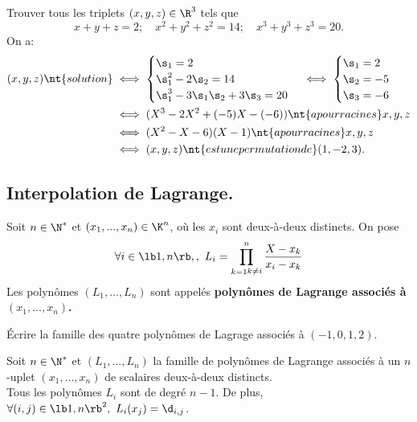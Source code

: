 \documentclass[11pt]{article}
\begin{document}
\begin{ex}{}{}
    Trouver tous les triplets $(x,y,z)\in\R^3$ tels que
    \begin{equation*}
        x+y+z=2; \quad x^2+y^2+z^2=14; \quad x^3+y^3+z^3=20.
    \end{equation*}
    \tcblower
    On a:
    \begin{align*}
        (x,y,z) \nt{ solution} &\iff \begin{cases}
            \s_1 = 2\\ \s_1^2-2\s_2 = 14\\ \s_1^3-3\s_1\s_2+3\s_3=20
        \end{cases} \iff \begin{cases}
            \s_1 = 2\\\s_2=-5\\\s_3=-6
        \end{cases}\\
        &\iff (X^3-2X^2+(-5)X-(-6)) \nt{ a pour racines } x,y,z\\
        &\iff (X^2-X-6)(X-1) \nt{ a pour racines } x,y,z\\
        &\iff (x,y,z) \nt{ est une permutation de } (1,-2,3).
    \end{align*}
\end{ex}

\subsection{Interpolation de Lagrange.}

\begin{defi}{}{}
    Soit $n\in\N^*$ et $(x_1,...,x_n)\in\K^n$, où les $x_i$ sont deux-à-deux distincts. On pose
    \begin{equation*}
        \forall i \in \lb1,n\rb,, ~ L_i = \prod_{\substack{k=1}\\k\neq i}^n\frac{X-x_k}{x_i-x_k}
    \end{equation*}
    Les polynômes $(L_1,...,L_n)$ sont appelés \bf{polynômes de Lagrange} associés à $(x_1,...,x_n)$.
\end{defi}

\begin{ex}{}{}
    Écrire la famille des quatre polynômes de Lagrage associés à $(-1,0,1,2)$.
\end{ex}

\begin{prop}{}{}
    Soit $n\in\N^*$ et $(L_1,...,L_n)$ la famille de polynômes de Lagrange associés à un $n$-uplet $(x_1,...,x_n)$ de scalaires deux-à-deux distincts.\\
    Tous les polynômes $L_i$ sont de degré $n-1$. De plus, $\forall (i,j)\in\lb1,n\rb^2,~L_i(x_j)=\d_{i,j}$.
\end{prop}
\end{document}

